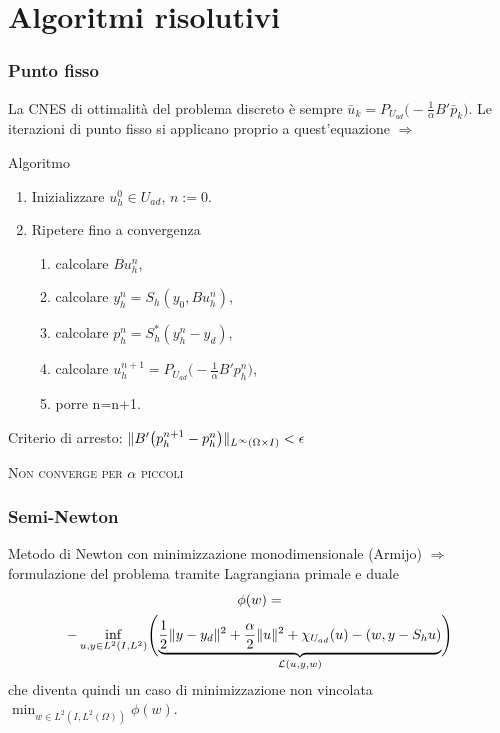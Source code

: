 \documentclass{beamer}
\theoremstyle{definition}
\theoremstyle{remark}
\theoremstyle{plain}
\theoremstyle{definition}
\DeclarePairedDelimiter{\norma}{\lVert}{\rVert}
\begin{document}
\section{Algoritmi risolutivi}
\begin{frame}
\frametitle{Punto fisso}
La CNES di ottimalità del problema discreto è sempre $ \bar{u}_k=P_{U_{ad}}\big( -\frac{1}{\alpha}B'\bar{p}_k\big) $. Le iterazioni di punto fisso si applicano proprio a quest'equazione $ \Rightarrow $
\begin{block}{Algoritmo}
\begin{enumerate}
\item Inizializzare $ u^0_h\in U_{ad} $, $ n:=0 $.
\item Ripetere fino a convergenza
          \begin{enumerate}
          \item calcolare $ Bu^n_h $,
          \item calcolare $ y^n_h=S_h(y_0,Bu^n_h) $, 
          \item calcolare $ p^n_h=S^*_h(y^n_h-y_d) $,
          \item calcolare $ u^{n+1}_h=P_{U_{ad}}\big( -\frac{1}{\alpha}B'p^n_h\big) $,
          \item porre n=n+1.
          \end{enumerate}
\end{enumerate}
Criterio di arresto: $ \norma{B'\big(p^{n+1}_h-p^n_h\big)}_{L^{\infty}(\Omega\times I)}<\epsilon $
\end{block}
{\scshape {\Large Non converge per $ \alpha $ piccoli}}
\end{frame}

\begin{frame}
\frametitle{Semi-Newton}
Metodo di Newton con minimizzazione monodimensionale (Armijo) $ \Rightarrow $ formulazione del problema tramite Lagrangiana primale e duale
\begin{multline}
\phi(w)= \\
-\inf_{u,y\in L^2(I,L^2)}\Biggl( \underbrace{\frac{1}{2}\norma{y-y_d}^2 + \frac{\alpha}{2}\norma{u}^2  + \chi_{U_{ad}}(u) - (w,y-S_hu)}_{\mathcal{L}(u,y,w)}\Biggr)
\end{multline}
che diventa quindi un caso di minimizzazione non vincolata $ \min_{w\in L^2(I,L^2(\Omega))} \phi(w) $.
\end{frame}
\end{document}
